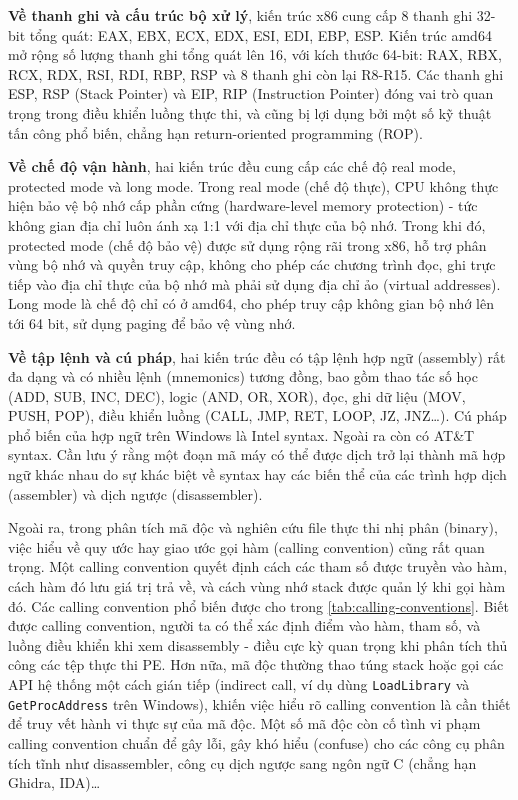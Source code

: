 \textbf{Về thanh ghi và cấu trúc bộ xử lý}, kiến trúc x86
cung cấp 8 thanh ghi 32-bit tổng quát: EAX, EBX, ECX, EDX,
ESI, EDI, EBP, ESP. Kiến trúc amd64 mở rộng số lượng
thanh ghi tổng quát lên 16, với kích thước 64-bit: RAX,
RBX, RCX, RDX, RSI, RDI, RBP, RSP và 8 thanh ghi còn lại
R8-R15. Các thanh ghi ESP, RSP (Stack Pointer) và EIP,
RIP (Instruction Pointer) đóng vai trò quan trọng trong
điều khiển luồng thực thi, và cũng bị lợi dụng bởi một số
kỹ thuật tấn công phổ biến, chẳng hạn return-oriented
programming (ROP).

\textbf{Về chế độ vận hành}, hai kiến trúc đều cung cấp
các chế độ real mode, protected mode và long mode.
Trong real mode (chế độ thực), CPU không thực hiện bảo
vệ bộ nhớ cấp phần cứng (hardware-level memory protection) - tức
không gian địa chỉ luôn ánh xạ 1:1 với địa chỉ thực của bộ nhớ.
Trong khi đó, protected mode (chế độ bảo vệ) được sử dụng rộng
rãi trong x86, hỗ trợ phân vùng bộ nhớ và quyền truy cập,
không cho phép các chương trình đọc, ghi trực tiếp vào địa
chỉ thực của bộ nhớ mà phải sử dụng địa chỉ ảo (virtual addresses).
Long mode là chế độ chỉ có ở amd64, cho phép truy cập không gian
bộ nhớ lên tới 64 bit, sử dụng paging để bảo vệ vùng nhớ.

\textbf{Về tập lệnh và cú pháp}, hai kiến trúc đều có
tập lệnh hợp ngữ (assembly) rất đa dạng và có nhiều lệnh
(mnemonics) tương đồng, bao gồm thao tác số học (ADD,
SUB, INC, DEC), logic (AND, OR, XOR), đọc, ghi dữ liệu
(MOV, PUSH, POP), điều khiển luồng (CALL, JMP, RET, LOOP,
JZ, JNZ\dots). Cú pháp phổ biến của hợp ngữ trên Windows
là Intel syntax. Ngoài ra còn có AT\&T syntax. Cần lưu ý
rằng một đoạn mã máy có thể được dịch trở lại thành mã
hợp ngữ khác nhau do sự khác biệt về syntax hay các biến
thể của các trình hợp dịch (assembler) và dịch ngược
(disassembler).

Ngoài ra, trong phân tích mã độc và nghiên cứu file thực thi nhị phân (binary),
việc hiểu về quy ước hay giao ước gọi hàm (calling convention) cũng rất
quan trọng. Một calling convention quyết định cách các tham số được
truyền vào hàm, cách hàm đó lưu giá trị trả về, và cách
vùng nhớ stack được quản lý khi gọi hàm đó. Các calling
convention phổ biến được cho trong \ref{tab:calling-conventions}. Biết được
calling convention, người ta có thể xác định điểm vào
hàm, tham số, và luồng điều khiển khi xem disassembly - điều
cực kỳ quan trọng khi phân tích thủ công các tệp thực thi PE.
Hơn nữa, mã độc thường thao túng stack hoặc gọi các API hệ
thống một cách gián tiếp (indirect call, ví dụ dùng
\texttt{LoadLibrary} và \texttt{GetProcAddress} trên Windows),
khiến việc hiểu rõ calling convention là cần thiết để truy vết
hành vi thực sự của mã độc. Một số mã độc còn cố tình vi
phạm calling convention chuẩn để gây lỗi, gây khó hiểu (confuse)
cho các công cụ phân tích tĩnh như disassembler, công cụ dịch
ngược sang ngôn ngữ C (chẳng hạn Ghidra, IDA)\dots

